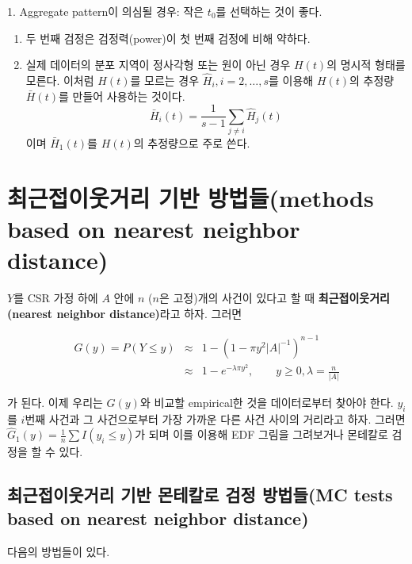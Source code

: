 \documentclass[b5paper,]{book}
\theoremstyle{definition}
\theoremstyle{definition}
\theoremstyle{definition}
\theoremstyle{remark}
\let\BeginKnitrBlock\begin \let\EndKnitrBlock\end
\begin{document}
\BeginKnitrBlock{corollary}
\protect\hypertarget{cor:unnamed-chunk-203}{}{\label{cor:unnamed-chunk-203}
}1. Aggregate pattern이 의심될 경우: 작은 \(t_{0}\)를 선택하는 것이
좋다.

\begin{enumerate}
\def\labelenumi{\arabic{enumi}.}
\setcounter{enumi}{1}
\item
  두 번째 검정은 검정력(power)이 첫 번째 검정에 비해 약하다.
\item
  실제 데이터의 분포 지역이 정사각형 또는 원이 아닌 경우 \(H(t)\)의
  명시적 형태를 모른다. 이처럼 \(H(t)\)를 모르는 경우
  \(\hat{H}_{i}, i=2,\ldots, s\)를 이용해 \(H(t)\)의 추정량
  \(\bar{H}(t)\)를 만들어 사용하는 것이다.
  \[\bar{H}_{i}(t)=\frac{1}{s-1}\sum_{j\neq i}\hat{H}_{j}(t)\] 이며
  \(\bar{H}_{1}(t)\)를 \(H(t)\)의 추정량으로 주로 쓴다.
\end{enumerate}
\EndKnitrBlock{corollary}

\section{최근접이웃거리 기반 방법들(methods based on nearest neighbor
distance)}\label{--methods-based-on-nearest-neighbor-distance}

\(Y\)를 CSR 가정 하에 \(A\) 안에 \(n\) (\(n\)은 고정)개의 사건이 있다고
할 때 \textbf{최근접이웃거리(nearest neighbor distance)}라고 하자.
그러면

\begin{eqnarray*}
G(y)=P(Y\leq y)&\approx & 1-(1-\pi y^{2}|A|^{-1})^{n-1}\\
&\approx& 1-e^{-\lambda \pi y^{2}}, \qquad{y \geq 0, \lambda =\frac{n}{|A|}}
\end{eqnarray*}

가 된다. 이제 우리는 \(G(y)\)와 비교할 empirical한 것을 데이터로부터
찾아야 한다. \(y_{i}\)를 \(i\)번째 사건과 그 사건으로부터 가장 가까운
다른 사건 사이의 거리라고 하자. 그러면
\(\hat{G}_{1}(y)=\frac{1}{n}\sum I(y_{i} \leq y)\)가 되며 이를 이용해
EDF 그림을 그려보거나 몬테칼로 검정을 할 수 있다.

\subsection{최근접이웃거리 기반 몬테칼로 검정 방법들(MC tests based on
nearest neighbor
distance)}\label{----mc-tests-based-on-nearest-neighbor-distance}

다음의 방법들이 있다.
\end{document}
